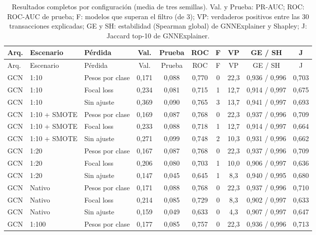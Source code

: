 \begin{longtable}{lllccccccc}
\caption{Resultados completos por configuración (media de tres semillas). Val. y Prueba: PR-AUC; ROC: ROC-AUC de prueba; F: modelos que superan el filtro (de 3); VP: verdaderos positivos entre las 30 transacciones explicadas; GE y SH: estabilidad (Spearman global) de GNNExplainer y Shapley; J: Jaccard top-10 de GNNExplainer.}\label{tab:completa}\\
\toprule
Arq. & Escenario & Pérdida & Val. & Prueba & ROC & F & VP & GE / SH & J \\
\midrule
\endfirsthead
\toprule
Arq. & Escenario & Pérdida & Val. & Prueba & ROC & F & VP & GE / SH & J \\
\midrule
\endhead
GCN & 1:10 & Pesos por clase & 0{,}171 & 0{,}088 & 0{,}770 & 0 & 22{,}3 & 0{,}936 / 0{,}996 & 0{,}703 \\
GCN & 1:10 & Focal loss & 0{,}234 & 0{,}081 & 0{,}715 & 1 & 12{,}7 & 0{,}914 / 0{,}997 & 0{,}675 \\
GCN & 1:10 & Sin ajuste & 0{,}369 & 0{,}090 & 0{,}765 & 3 & 13{,}7 & 0{,}941 / 0{,}997 & 0{,}693 \\
GCN & 1:10 + SMOTE & Pesos por clase & 0{,}169 & 0{,}087 & 0{,}768 & 0 & 22{,}3 & 0{,}937 / 0{,}996 & 0{,}709 \\
GCN & 1:10 + SMOTE & Focal loss & 0{,}233 & 0{,}088 & 0{,}718 & 1 & 12{,}7 & 0{,}914 / 0{,}997 & 0{,}664 \\
GCN & 1:10 + SMOTE & Sin ajuste & 0{,}271 & 0{,}099 & 0{,}748 & 2 & 10{,}3 & 0{,}931 / 0{,}996 & 0{,}662 \\
GCN & 1:20 & Pesos por clase & 0{,}167 & 0{,}087 & 0{,}768 & 0 & 22{,}3 & 0{,}937 / 0{,}996 & 0{,}709 \\
GCN & 1:20 & Focal loss & 0{,}206 & 0{,}080 & 0{,}703 & 1 & 10{,}0 & 0{,}906 / 0{,}997 & 0{,}636 \\
GCN & 1:20 & Sin ajuste & 0{,}147 & 0{,}045 & 0{,}645 & 1 & 8{,}3 & 0{,}940 / 0{,}995 & 0{,}680 \\
GCN & Nativo & Pesos por clase & 0{,}171 & 0{,}088 & 0{,}768 & 0 & 22{,}3 & 0{,}937 / 0{,}996 & 0{,}710 \\
GCN & Nativo & Focal loss & 0{,}214 & 0{,}085 & 0{,}729 & 0 & 8{,}3 & 0{,}902 / 0{,}997 & 0{,}633 \\
GCN & Nativo & Sin ajuste & 0{,}159 & 0{,}049 & 0{,}633 & 0 & 4{,}3 & 0{,}907 / 0{,}997 & 0{,}647 \\
GCN & 1:100 & Pesos por clase & 0{,}177 & 0{,}085 & 0{,}757 & 0 & 22{,}3 & 0{,}936 / 0{,}996 & 0{,}713 \\

\end{longtable}
